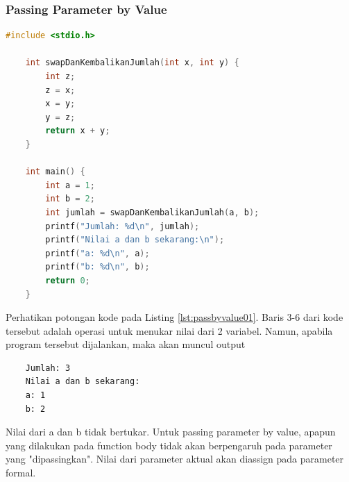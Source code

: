 \subsubsection{Passing Parameter by Value}

\begin{lstlisting}[language=c,caption = Passing by Value,label=lst:passbyvalue01]
    #include <stdio.h>

    int swapDanKembalikanJumlah(int x, int y) {
        int z;
        z = x;
        x = y;
        y = z;
        return x + y;
    }
    
    int main() {
        int a = 1;
        int b = 2;
        int jumlah = swapDanKembalikanJumlah(a, b);
        printf("Jumlah: %d\n", jumlah);
        printf("Nilai a dan b sekarang:\n");
        printf("a: %d\n", a);
        printf("b: %d\n", b);
        return 0;
    }
\end{lstlisting}

Perhatikan potongan kode pada Listing \ref{lst:passbyvalue01}. Baris 3-6 dari kode tersebut adalah operasi untuk menukar nilai dari 2 variabel. Namun, apabila program tersebut dijalankan, maka akan muncul output
\begin{verbatim}
    Jumlah: 3
    Nilai a dan b sekarang:
    a: 1
    b: 2
\end{verbatim}
Nilai dari a dan b tidak bertukar. Untuk passing parameter by value, apapun yang dilakukan pada function body tidak akan berpengaruh pada parameter yang "dipassingkan". Nilai dari parameter aktual akan diassign pada parameter formal.

